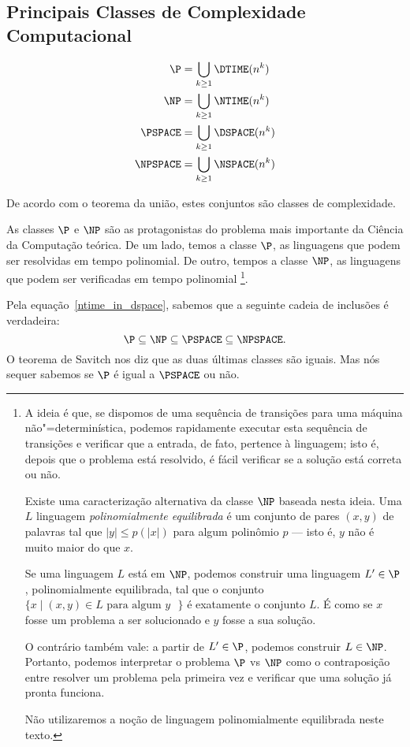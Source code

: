\subsection{Principais Classes de Complexidade Computacional}
\label{principais_classes}

\begin{definition}
    \begin{align*}
        \P &= \bigcup_{k \geq 1} \DTIME(n^k) \\
        \NP &= \bigcup_{k \geq 1} \NTIME(n^k) \\
        \PSPACE &= \bigcup_{k \geq 1} \DSPACE(n^k) \\
        \NPSPACE &= \bigcup_{k \geq 1} \NSPACE(n^k) \\
    \end{align*}
\end{definition}

De acordo com o teorema da união,
estes conjuntos são classes de complexidade.

As classes $\P$ e $\NP$ são as protagonistas
do problema mais importante da Ciência da Computação teórica.
De um lado, temos a classe $\P$,
as linguagens que podem ser resolvidas em tempo polinomial.
De outro, tempos a classe $\NP$,
as linguagens que podem ser verificadas em tempo polinomial%
\footnote{
    A ideia é que,
    se dispomos de uma sequência de transições para uma máquina não"=determinística,
    podemos rapidamente executar esta sequência de transições
    e verificar que a entrada, de fato, pertence à linguagem;
    isto é, depois que o problema está resolvido,
    é fácil verificar se a solução está correta ou não.

    Existe uma caracterização alternativa da classe $\NP$ baseada nesta ideia.
    Uma $L$ linguagem \emph{polinomialmente equilibrada}
    é um conjunto de pares $(x, y)$ de palavras
    tal que $|y| \leq p(|x|)$ para algum polinômio $p$
    \cite[p.~298]{Papadimitriou1998}
    --- isto é, $y$ não é muito maior do que $x$.

    Se uma linguagem $L$ está em $\NP$,
    podemos construir uma linguagem $L' \in \P$,
    polinomialmente equilibrada,
    tal que o conjunto $\{x \mid (x, y) \in L \text{ para algum $y$ }\}$
    é exatamente o conjunto $L$.
    É como se $x$ fosse um problema a ser solucionado
    e $y$ fosse a sua solução.

    O contrário também vale: a partir de $L' \in \P$,
    podemos construir $L \in \NP$.
    Portanto, podemos interpretar o problema $\P$ vs $\NP$
    como o contraposição entre resolver um problema pela primeira vez
    e verificar que uma solução já pronta funciona.

    Não utilizaremos a noção de linguagem polinomialmente equilibrada neste texto.
}.

Pela equação~\ref{ntime_in_dspace},
sabemos que a seguinte cadeia de inclusões é verdadeira:
\begin{equation*}
    \P \subseteq \NP \subseteq \PSPACE \subseteq \NPSPACE.
\end{equation*}
O teorema de Savitch nos diz que as duas últimas classes são iguais.
Mas nós sequer sabemos se $\P$ é igual a $\PSPACE$ ou não.
